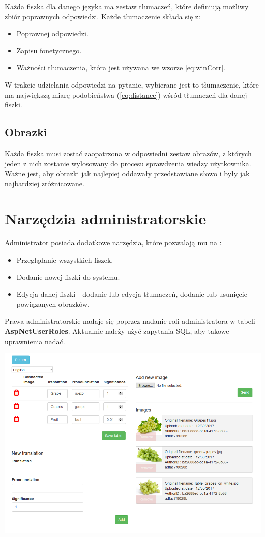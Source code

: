 Każda fiszka dla danego języka ma zestaw tłumaczeń, które definiują możliwy zbiór poprawnych odpowiedzi. Każde tłumaczenie składa się z:
\begin{itemize}
	\item Poprawnej odpowiedzi.
	\item Zapisu fonetycznego.
	\item Ważności tłumaczenia, która jest używana we wzorze \ref{eq:winCorr}.
\end{itemize}
W trakcie udzielania odpowiedzi na pytanie, wybierane jest to tłumaczenie, które ma największą miarę podobieństwa (\ref{eq:distance}) wśród tłumaczeń dla danej fiszki.

\subsection{Obrazki}

Każda fiszka musi zostać zaopatrzona w odpowiedni zestaw obrazów, z których jeden z nich zostanie wylosowany do procesu sprawdzenia wiedzy użytkownika. Ważne jest, aby obrazki jak najlepiej oddawały przedstawiane słowo i były jak najbardziej zróżnicowane.


\section{Narzędzia administratorskie}

Administrator posiada dodatkowe narzędzia, które pozwalają mu na :
\begin{itemize}
	\item Przeglądanie wszystkich fiszek.
	\item Dodanie nowej fiszki do systemu.
	\item Edycja danej fiszki - dodanie lub edycja tłumaczeń, dodanie lub usunięcie powiązanych obrazków.
\end{itemize}
Prawa administratorskie nadaje się poprzez nadanie roli administratora w tabeli \textbf{AspNetUserRoles}. Aktualnie należy użyć zapytania SQL, aby takowe uprawnienia nadać. 

\begin{center}
	\centering
	\includegraphics[width=\textwidth]{images/Management.png}
\end{center}


